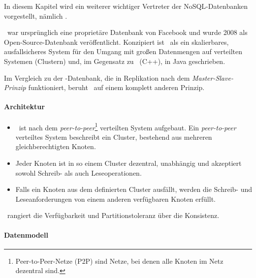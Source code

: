 In diesem Kapitel wird ein weiterer wichtiger Vertreter der NoSQL-Datenbanken vorgestellt, nämlich \cass.

\cass\ war ursprünglich eine proprietäre Datenbank von Facebook und wurde 2008 als Open-Source-Datenbank veröffentlicht. Konzipiert ist \cass\ als ein skalierbares, ausfallsicheres System für den Umgang mit großen Datenmengen auf verteilten Systemen (Clustern) und, im Gegensatz zu \mongo\ (C++), in Java geschrieben.


Im Vergleich zu der \mongo-Datenbank, die in Replikation nach dem \textit{Master-Slave-Prinzip} funktioniert, beruht \cass\ auf einem komplett anderen Prinzip. %

\paragraph{Architektur}

\begin{itemize}
\item \cass\ ist nach dem \textit{peer-to-peer}\footnote{Peer-to-Peer-Netze (P2P) sind Netze, bei denen alle Knoten im Netz dezentral sind.} verteilten System aufgebaut. Ein \textit{peer-to-peer} verteiltes System beschreibt ein Cluster, bestehend aus mehreren gleichberechtigten Knoten.  
\item Jeder Knoten ist in so einem Cluster dezentral, unabhängig und akzeptiert sowohl Schreib- als auch Leseoperationen.
\item Falls ein Knoten aus dem definierten Cluster ausfällt, werden die Schreib- und Leseanforderungen von einem anderen verfügbaren Knoten erfüllt.
\end{itemize}
\cass\ rangiert die Verfügbarkeit und Partitionstoleranz über die Konsistenz.

\paragraph{Datenmodell}


